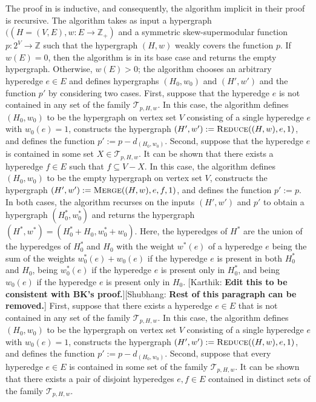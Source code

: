 \documentclass{article}
\newcommand{\maximalTightSetFamily}[1]{\ensuremath{\calT_{#1}}\xspace}
\newcommand{\shubhang}[1]{{\color{blue}[{\tiny Shubhang: \bf #1}]\marginpar{\color{blue}*}}}
\newcommand{\knote}[1]{{\color{red}[{\tiny Karthik: \bf #1}]\marginpar{\color{red}*}}}
\newcommand{\merge}{\ensuremath{\textsc{Merge}}\xspace}
\newcommand{\reduce}{\ensuremath{\textsc{Reduce}}\xspace}
\providecommand{\Z}{\mathbb{Z}}
\providecommand{\calT}{\mathcal{T}}
\begin{document}
The proof in \cite{Bernath-Kiraly} is inductive, and consequently, the algorithm implicit in their proof is recursive. The algorithm takes as input a hypergraph $((H=(V, E), w: E\rightarrow \Z_+)$ and a symmetric skew-supermodular function $p: 2^V\rightarrow \Z$ such that the hypergraph $(H,w)$ weakly covers the function $p$. 
If $w(E) = 0$, then the algorithm is in its base case and returns the empty hypergraph. 
Otherwise, $w(E) > 0$; the algorithm chooses an arbitrary hyperedge $e \in E$ and defines hypergraphs $(H_0, w_0)$ and $(H', w')$ and the function $p'$ by considering two cases.
First, suppose that the hyperedge $e$ is not contained in any set of the family $\maximalTightSetFamily{p, H, w}$. 
In this case, the algorithm defines $(H_0, w_0)$ to be the hypergraph on vertex set $V$ consisting of a single hyperedge $e$ with $w_0(e) = 1$, constructs the hypergraph $(H', w'):=\reduce((H, w), e, 1)$, and defines the function $p' := p - d_{(H_0, w_0)}$. Second, suppose that the hyperedge $e$ is contained in some set $X \in \mathcal{T}_{p, H, w}$. It can be shown that there exists a hyperedge $f \in E$ such that $f \subseteq V - X$. In this case, the algorithm defines $(H_0, w_0)$ to be the empty hypergraph on vertex set $V$, constructs the hypergraph $(H', w'):=\merge((H, w), e, f, 1)$, and defines the function $p' := p$. In both cases, the algorithm recurses on the inputs $(H',w')$ and $p'$ to obtain a hypergraph $(H^*_0, w^*_0)$ and returns the hypergraph $(H^*, w^*) = (H^*_0 + H_0, w^*_0 + w_0)$. 
Here, the hyperedges of $H^*$ are the union of the hyperedges of $H^*_0$ and $H_0$ with the weight $w^*(e)$ of a hyperedge $e$ being the sum of the weights $w^*_0(e)+w_0(e)$ if the hyperedge $e$ is present in both $H^*_0$ and $H_0$, being $w^*_0(e)$ if the hyperedge $e$ is present only in $H^*_0$, and being $w_0(e)$ if the hyperedge $e$ is present only in $H_0$. 
\iffalse
\knote{Edit this to be consistent with BK's proof.}\shubhang{Rest of this paragraph can be removed.}
First, suppose that there exists a hyperedge $e\in E$ that is not contained in any set of the family $\maximalTightSetFamily{p, H, w}$. 
In this case, the algorithm defines $(H_0, w_0)$ to be the hypergraph on vertex set $V$ consisting of a single hyperedge $e$ with $w_0(e) = 1$,
constructs the hypergraph $(H', w'):=\reduce((H, w), e, 1)$, and defines the function $p' := p - d_{(H_0, w_0)}$.
Second, suppose that every hyperedge $e\in E$ is contained in some set of the family $\mathcal{T}_{p, H, w}$. It can be shown that there exists a pair of disjoint hyperedges $e, f\in E$ contained in distinct sets of the family $\maximalTightSetFamily{p, H, w}$.
\end{document}
